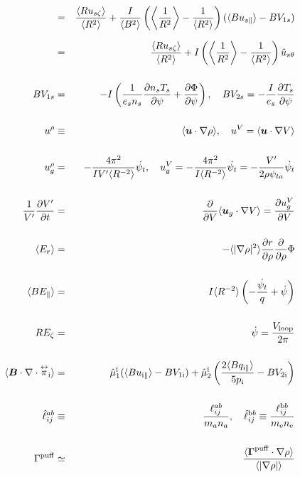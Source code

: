 \documentclass[11pt]{article}
\def\bvec#1{\leavevmode\hbox{\boldmath$#1$}}
\let\vec=\bvec
\def\r#1{{\rm#1}}
\def\ave#1{\left\langle#1\right\rangle}
\def\aves#1{\langle#1\rangle}
\def\dd#1#2{\frac{\partial #1}{\partial #2}}
\def\tensor#1{\mathord{\displaystyle\mathop{#1}^\leftrightarrow}}
\def\para{\parallel}
\def\ddrho{\frac{\partial}{\partial\rho}}
\def\psid{\dot{\psi}}
\def\psit{\psi_t}
\def\psitd{\dot{\psit}}
\def\uszt{u_{s\zeta}}
\def\uspara{u_{s\para}}
\def\ugrho{u_{g}^\rho}
\def\ugV{u_{g}^V}
\def\Er{E_r}
\begin{document}
\begin{eqnarray}
%
  &=& \frac{\aves{R\uszt}}{\aves{R^2}}
%
  + \frac{I}{\aves{B^2}} \left(  \ave{\frac{1}{R^2}}
			      - \frac{1}{\aves{R^2}} \right)
    (\aves{B\uspara} - BV_{1s})
\nonumber\\[2.5mm]
%
  &=& \frac{\aves{R\uszt}}{\aves{R^2}}
%
  + I \left(  \ave{\frac{1}{R^2}}
			       - \frac{1}{\aves{R^2}} \right) \hat{u}_{s\theta}
\nonumber\\[5mm]
  B V_{1s} &=&
%
 - I \left( \frac{1}{e_s n_s} \dd{n_s T_s}{\psi} + \dd{\Phi}{\psi}\right),
\quad
  B V_{2s} =
%
 - \frac{I}{e_s} \dd{T_s}{\psi}
\\[5mm]
  u^\rho &\equiv&
%
  \aves{ \vec{u} \cdot \nabla\rho },
%
  \quad u^V = \aves{ \vec{u} \cdot \nabla V }
\\[5mm]
  \ugrho &=&
%
  - \frac{4\pi^2}{IV'\aves{R^{-2}}} \psitd,
%
  \quad \ugV = - \frac{4\pi^2}{I\aves{R^{-2}}} \psitd = - \frac{V'}{2\rho\psi_{ta}}\psitd
\\[5mm]
  \frac{1}{V'}\dd{V'}{t} &=&
%
  \dd{}{V}\aves{\vec{u}_g\cdot\nabla V} = \dd{u_g^V}{V}
\\[5mm]
  \aves{\Er} &=&
%
  - \aves{|\nabla\rho|^2} \dd{r}{\rho} \ddrho \Phi
\\[5mm]
  \aves{B E_\para} &=&
%
  I \aves{R^{-2}} \left( - \frac{\psitd}{q} + \psid \right)
\\[5mm]
  R E_\zeta &=&
%
  \psid
%
  = \frac{V_\r{loop}}{2\pi}
\\[5mm]
  \aves{\vec{B}\cdot\nabla\cdot\tensor{\pi}_\r{i}} &=&
%
  \hat{\mu}_1^\r{i} ( \aves{Bu_{\r{i}\para}} - BV_{1\r{i}}) 
%
  + \hat{\mu}_2^\r{i} \left( \frac{2\aves{Bq_{\r{i}\para}}}{5p_\r{i}} -
		       BV_{2\r{i}}\right)
\\[5mm]
  \hat{\ell}_{ij}^{ab} &\equiv& \frac{\ell_{ij}^{ab}}{m_an_a},
  \quad
  \hat{\ell}_{ij}^{\r{b}b} \equiv \frac{\ell_{ij}^{\r{b}b}}{m_\r{e}n_\r{e}}
\\[5mm]
  \Gamma^\r{puff} &\simeq& \frac{\aves{\vec{\Gamma}^\r{puff}\cdot\nabla\rho}}{\aves{|\nabla\rho|}}
\end{eqnarray}
\end{document}
